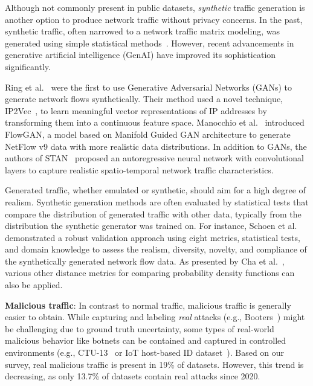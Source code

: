 Although not commonly present in public datasets, \emph{synthetic} traffic generation is another option to produce network traffic without privacy concerns. In the past, synthetic traffic, often narrowed to a network traffic matrix modeling, was generated using simple statistical methods~\cite{nucci2005_synthetically_generating_ip_matrices}. However, recent advancements in generative artificial intelligence (GenAI) have improved its sophistication significantly.

Ring et al.~\cite{ring2019_flowbased_generation_gans} were the first to use Generative Adversarial Networks (GANs) to generate network flows synthetically. Their method used a novel technique, IP2Vec~\cite{ring2017_ip2vec}, to learn meaningful vector representations of IP addresses by transforming them into a continuous feature space. Manocchio et al.~\cite{manocchio2021_flowgan} introduced FlowGAN, a model based on Manifold Guided GAN architecture to generate NetFlow v9 data with more realistic data distributions. In addition to GANs, the authors of STAN~\cite{xu2021_stan} proposed an autoregressive neural network with convolutional layers to capture realistic spatio-temporal network traffic characteristics.

Generated traffic, whether emulated or synthetic, should aim for a high degree of realism. Synthetic generation methods are often evaluated by statistical tests that compare the distribution of generated traffic with other data, typically from the distribution the synthetic generator was trained on. For instance, Schoen et al.~\cite{schoen2024_tale_two_methods} demonstrated a robust validation approach using eight metrics, statistical tests, and domain knowledge to assess the realism, diversity, novelty, and compliance of the synthetically generated network flow data. As presented by Cha et al.~\cite{cha2007_distance_measures_survey}, various other distance metrics for comparing probability density functions can also be applied.

\textbf{Malicious traffic}: In contrast to normal traffic, malicious traffic is generally easier to obtain. While capturing and labeling \emph{real} attacks (e.g., Booters~\cite{santanna2015_booters}) might be challenging due to ground truth uncertainty, some types of real-world malicious behavior like botnets can be contained and captured in controlled environments (e.g., CTU-13~\cite{garcia2014_ctu13} or IoT host-based ID dataset~\cite{bezerra2018_iot_hostbased_dataset}). Based on our survey, real malicious traffic is present in 19\% of datasets. However, this trend is decreasing, as only 13.7\% of datasets contain real attacks since 2020.


